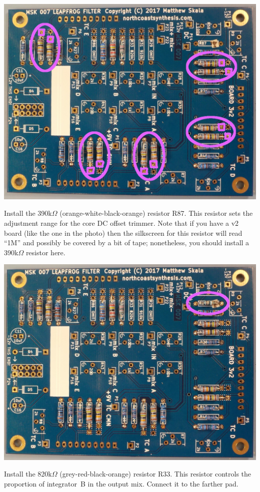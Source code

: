\nopagebreak
\noindent\includegraphics[width=\linewidth]{res-140k3.jpg}

Install the 390k$\Omega$ (orange-white-black-orange) resistor R87.  This
resistor sets the adjustment range for the core DC offset trimmer.  Note that
if you have a v2 board (like the one in the photo) then the silkscreen for
this resistor will read ``1M'' and possibly be covered by a bit of tape;
nonetheless, you should install a 390k$\Omega$ resistor here.

\nopagebreak
\noindent\includegraphics[width=\linewidth]{res-390k3.jpg}

\newpage

Install the 820k$\Omega$ (grey-red-black-orange) resistor R33.  This resistor
controls the proportion of integrator~B in the output mix.  Connect it to
the farther pad.

